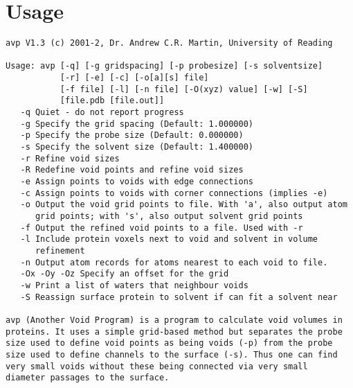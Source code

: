 \documentclass{article}
\begin{document}
\section{Usage}

\begin{verbatim}
avp V1.3 (c) 2001-2, Dr. Andrew C.R. Martin, University of Reading

Usage: avp [-q] [-g gridspacing] [-p probesize] [-s solventsize]
           [-r] [-e] [-c] [-o[a][s] file] 
           [-f file] [-l] [-n file] [-O(xyz) value] [-w] [-S] 
           [file.pdb [file.out]]
   -q Quiet - do not report progress
   -g Specify the grid spacing (Default: 1.000000)
   -p Specify the probe size (Default: 0.000000)
   -s Specify the solvent size (Default: 1.400000)
   -r Refine void sizes
   -R Redefine void points and refine void sizes
   -e Assign points to voids with edge connections
   -c Assign points to voids with corner connections (implies -e)
   -o Output the void grid points to file. With 'a', also output atom
      grid points; with 's', also output solvent grid points
   -f Output the refined void points to a file. Used with -r
   -l Include protein voxels next to void and solvent in volume 
      refinement
   -n Output atom records for atoms nearest to each void to file.
   -Ox -Oy -Oz Specify an offset for the grid
   -w Print a list of waters that neighbour voids
   -S Reassign surface protein to solvent if can fit a solvent near

avp (Another Void Program) is a program to calculate void volumes in
proteins. It uses a simple grid-based method but separates the probe
size used to define void points as being voids (-p) from the probe
size used to define channels to the surface (-s). Thus one can find
very small voids without these being connected via very small 
diameter passages to the surface.
\end{verbatim}
\end{document}
